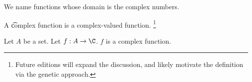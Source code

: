

We name functions whose domain is the complex numbers.


A \t{complex function} is a complex-valued function.
  \ifhmode\unskip\fi\footnote{
Future editions will expand the discussion, and likely motivate the definition via the genetic approach.
  }


Let $A$ be a set.
Let $f: A \to \C $.
$f$ is a complex function.

\blankpage
